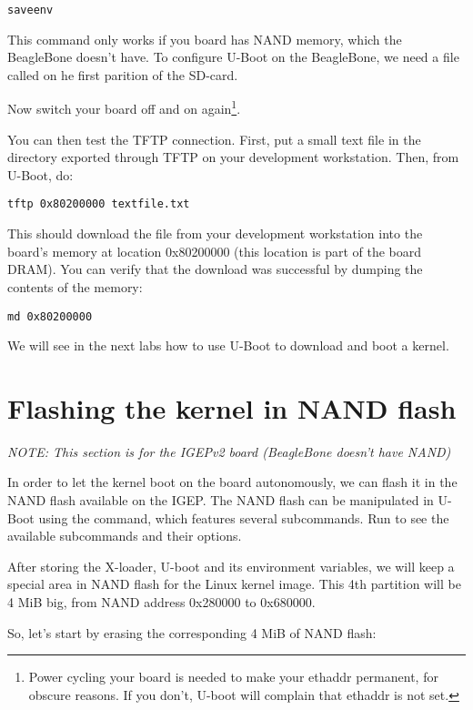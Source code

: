 \begin{verbatim}
saveenv
\end{verbatim}

This command only works if you board has NAND memory, which the BeagleBone doesn't have.
To configure U-Boot on the BeagleBone, we need a file called  on he first parition of the SD-card.

Now switch your board off and on again\footnote{Power cycling your
  board is needed to make your ethaddr permanent, for obscure
  reasons. If you don't, U-boot will complain that ethaddr is not
  set.}.

You can then test the TFTP connection. First, put a small text file in
the directory exported through TFTP on your development
workstation. Then, from U-Boot, do:

\begin{verbatim}
tftp 0x80200000 textfile.txt
\end{verbatim}

This should download the file  from your development
workstation into the board's memory at location 0x80200000 (this
location is part of the board DRAM). You can verify that the download
was successful by dumping the contents of the memory:

\begin{verbatim}
md 0x80200000
\end{verbatim}

We will see in the next labs how to use U-Boot to download and boot a kernel.

\section{Flashing the kernel in NAND flash}

\emph{NOTE: This section is for the IGEPv2 board (BeagleBone doesn't have NAND)}

In order to let the kernel boot on the board autonomously, we can
flash it in the NAND flash available on the IGEP. The NAND flash can
be manipulated in U-Boot using the  command, which
features several subcommands. Run  to see the
available subcommands and their options.

After storing the X-loader, U-boot and its environment variables, we
will keep a special area in NAND flash for the Linux kernel image.
This 4th partition will be 4 MiB big, from NAND address
0x280000 to 0x680000.

So, let's start by erasing the corresponding 4 MiB of NAND flash:

